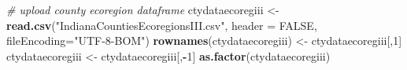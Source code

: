 \documentclass[
]{article}
\newenvironment{Shaded}{\begin{snugshade}}{\end{snugshade}}
\newcommand{\CommentTok}[1]{\textcolor[rgb]{0.56,0.35,0.01}{\textit{#1}}}
\newcommand{\DataTypeTok}[1]{\textcolor[rgb]{0.13,0.29,0.53}{#1}}
\newcommand{\DecValTok}[1]{\textcolor[rgb]{0.00,0.00,0.81}{#1}}
\newcommand{\KeywordTok}[1]{\textcolor[rgb]{0.13,0.29,0.53}{\textbf{#1}}}
\newcommand{\NormalTok}[1]{#1}
\newcommand{\OperatorTok}[1]{\textcolor[rgb]{0.81,0.36,0.00}{\textbf{#1}}}
\newcommand{\OtherTok}[1]{\textcolor[rgb]{0.56,0.35,0.01}{#1}}
\newcommand{\StringTok}[1]{\textcolor[rgb]{0.31,0.60,0.02}{#1}}
\begin{document}
\begin{Shaded}
\begin{Highlighting}[]
\CommentTok{# upload county ecoregion dataframe}
\NormalTok{ctydataecoregiii <-}\StringTok{ }\KeywordTok{read.csv}\NormalTok{(}\StringTok{"IndianaCountiesEcoregionsIII.csv"}\NormalTok{, }\DataTypeTok{header =} \OtherTok{FALSE}\NormalTok{, }\DataTypeTok{fileEncoding=}\StringTok{"UTF-8-BOM"}\NormalTok{)}
\KeywordTok{rownames}\NormalTok{(ctydataecoregiii) <-}\StringTok{ }\NormalTok{ctydataecoregiii[,}\DecValTok{1}\NormalTok{]}
\NormalTok{ctydataecoregiii <-}\StringTok{ }\NormalTok{ctydataecoregiii[,}\OperatorTok{-}\DecValTok{1}\NormalTok{]}
\KeywordTok{as.factor}\NormalTok{(ctydataecoregiii)}
\end{Highlighting}
\end{Shaded}
\end{document}
